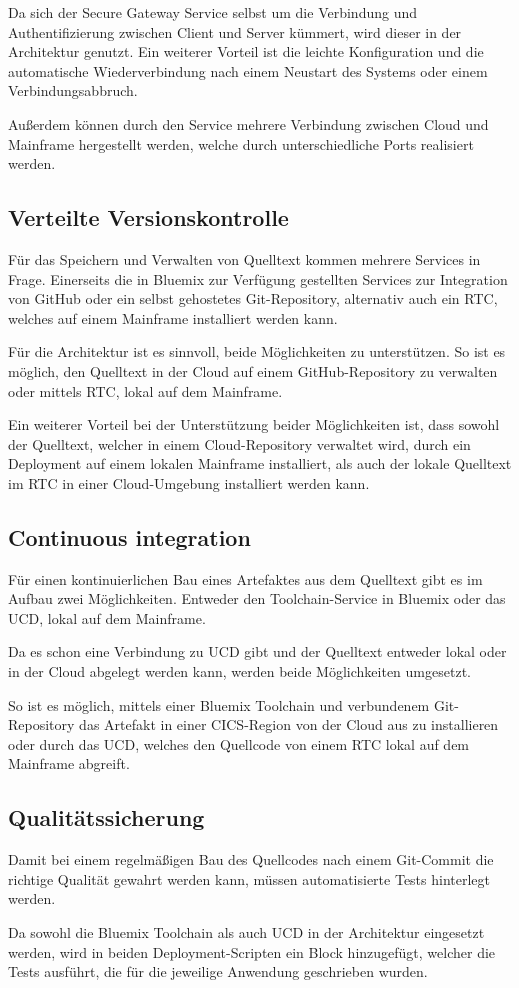 Da sich der Secure Gateway Service selbst um die Verbindung und Authentifizierung zwischen Client und Server kümmert, wird
dieser in der Architektur genutzt. Ein weiterer Vorteil ist die leichte Konfiguration und die automatische Wiederverbindung
nach einem Neustart des Systems oder einem Verbindungsabbruch.

Außerdem können durch den Service mehrere Verbindung zwischen Cloud und Mainframe hergestellt werden, welche durch
unterschiedliche Ports realisiert werden.

\subsection{Verteilte Versionskontrolle}
Für das Speichern und Verwalten von Quelltext kommen mehrere Services in Frage. Einerseits die in Bluemix zur Verfügung
gestellten Services zur Integration von GitHub oder ein selbst gehostetes Git-Repository, alternativ auch
ein RTC, welches auf einem Mainframe installiert werden kann.

Für die Architektur ist es sinnvoll, beide Möglichkeiten zu unterstützen. So ist es möglich, den Quelltext in der Cloud
auf einem GitHub-Repository zu verwalten oder mittels RTC, lokal auf dem Mainframe.

Ein weiterer Vorteil bei der Unterstützung beider Möglichkeiten ist, dass sowohl der Quelltext, welcher in einem Cloud-Repository
verwaltet wird, durch ein Deployment auf einem lokalen Mainframe installiert, als auch der lokale Quelltext im
RTC in einer Cloud-Umgebung installiert werden kann.

\subsection{Continuous integration}
Für einen kontinuierlichen Bau eines Artefaktes aus dem Quelltext gibt es im Aufbau zwei Möglichkeiten. Entweder
den Toolchain-Service in Bluemix oder das UCD, lokal auf dem Mainframe.

Da es schon eine Verbindung zu UCD gibt und der Quelltext entweder lokal oder in der Cloud abgelegt werden kann,
werden beide Möglichkeiten umgesetzt.

So ist es möglich, mittels einer Bluemix Toolchain und verbundenem Git-Repository
das Artefakt in einer CICS-Region von der Cloud aus zu installieren oder durch das UCD, welches den Quellcode von einem RTC
lokal auf dem Mainframe abgreift.

\subsection{Qualitätssicherung}
Damit bei einem regelmäßigen Bau des Quellcodes nach einem Git-Commit die richtige Qualität gewahrt werden kann, müssen
automatisierte Tests hinterlegt werden.

Da sowohl die Bluemix Toolchain als auch UCD in der Architektur eingesetzt werden, wird in beiden Deployment-Scripten
ein Block hinzugefügt, welcher die Tests ausführt, die für die jeweilige Anwendung geschrieben wurden.